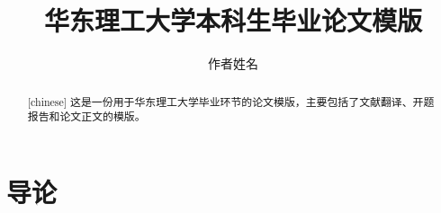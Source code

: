 \documentclass[a4paper]{ecust_thesis_translation}
\author{作者姓名}
\title{华东理工大学本科生毕业论文模版}
\begin{document}
\setlength{\parindent}{2em}


\maketitle

\begin{abstract}[chinese]
  这是一份用于华东理工大学毕业环节的论文模版，主要包括了文献翻译、开题报告和论文正文的模版。
\end{abstract}

\section{导论}
\end{document}
